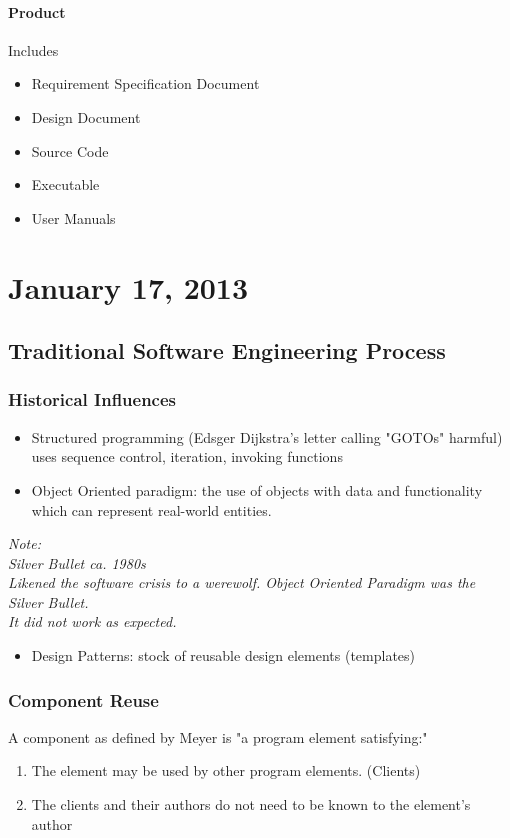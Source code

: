 \documentclass{report}
\begin{document}
		\subsubsection{Product}
			Includes
			\begin{itemize}
				\item Requirement Specification Document
				\item Design Document
				\item Source Code
				\item Executable
				\item User Manuals
			\end{itemize}
\chapter{January 17, 2013}
	\section{Traditional Software Engineering Process}
		\subsection{Historical Influences}
			\begin{itemize}
				\item Structured programming (Edsger Dijkstra's letter calling "GOTOs" harmful) uses sequence control, iteration, invoking functions
				\item Object Oriented paradigm: the use of objects with data and functionality which can represent real-world entities.
			\end{itemize}
			\textit{Note:\\Silver Bullet ca. 1980s\\ Likened the software crisis to a werewolf.  Object Oriented Paradigm was the Silver Bullet.\\It did not work as expected.}
			\begin{itemize}
				\item Design Patterns: stock of reusable design elements (templates)
			\end{itemize}
		\subsection{Component Reuse}
			A component as defined by Meyer is "a program element satisfying:"
			\begin{enumerate}
				\item The element may be used by other program elements. (Clients)
				\item The clients and their authors do not need to be known to the element's author
			\end{enumerate}
\end{document}
